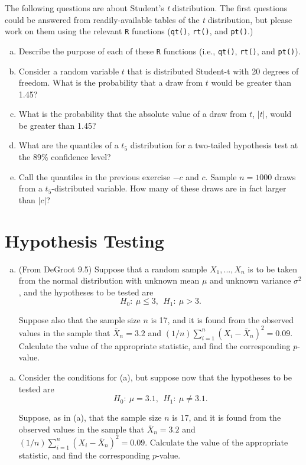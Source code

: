 \documentclass[12pt,letterpaper]{article}
\begin{document}
The following questions are about Student's \emph{t} distribution.  The first questions could be answered from readily-available tables of the \emph{t} distribution, but please work on them using the relevant \texttt{R} functions (\texttt{qt()}, \texttt{rt()}, and \texttt{pt()}.)

\begin{enumerate}[(a)]
	\item Describe the purpose of each of these \texttt{R} functions (i.e., \texttt{qt()}, \texttt{rt()}, and \texttt{pt()}). 
	\item Consider a random variable $t$ that is distributed Student-t with 20 degrees of freedom.  What is the probability that a draw from $t$ would be greater than 1.45? 
	\item What is the probability that the absolute value of a draw from $t$, $|t|$, would be greater than 1.45? 
	\item What are the quantiles of a $t_{5}$ distribution for a two-tailed hypothesis test at the 89\% confidence level? 
	\item Call the quantiles in the previous exercise $-c$ and $c$. Sample $n=1000$ draws from a $t_{5}$-distributed variable.  How many of these draws are in fact larger than $|c|$? 
\end{enumerate}


\section{Hypothesis Testing}

\begin{enumerate}[(a)]
	\item (From DeGroot 9.5) Suppose that a random sample $X_1, ... , X_n$ is to be taken from the normal distribution with unknown mean $\mu$ and unknown variance $\sigma^2$, and the hypotheses to be tested are \[H_0: ~ \mu\leq 3, ~~ H_1: ~ \mu > 3.\]
	
	Suppose also that the sample size $n$ is 17, and it is found from the observed values in the sample that $\bar X_n =3.2$ and $(1/n)\sum_{i=1}^{n}(X_i-\bar X_n)^2 = 0.09$. Calculate the value of the appropriate statistic, and find the corresponding $p$-value. 
\end{enumerate}


\begin{enumerate}[(b)]
	\item Consider the conditions for (a), but suppose now that the hypotheses to be tested are \[H_0: ~ \mu = 3.1, ~~ H_1: ~ \mu \neq 3.1.\]
	
	Suppose, as in (a), that the sample size $n$ is 17, and it is found from the observed values in the sample that $\bar X_n =3.2$ and $(1/n)\sum_{i=1}^{n}(X_i-\bar X_n)^2 = 0.09$. Calculate the value of the appropriate statistic, and find the corresponding $p$-value. 
\end{enumerate}
\end{document}
